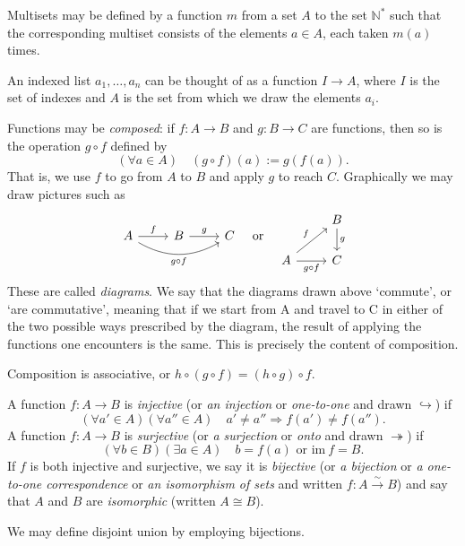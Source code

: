 Multisets may be defined by a function $m$ from a set $A$ to the set $\mathbb{N}^*$ such that the corresponding multiset consists of the elements $a\in A$, each taken $m(a)$ times.


An indexed list $a_1,\dots,a_n$ can be thought of as a function $I\rightarrow A$, where $I$ is the set of indexes and $A$ is the set from which we draw the elements $a_i$.


Functions may be \textit{composed}: if $f:A\rightarrow B$ and $g:B\rightarrow C$ are functions, then so is the operation $g\circ f$ defined by
\[
  (\forall a\in A)\quad (g\circ f)(a):=g(f(a)).
\]
That is, we use $f$ to go from $A$ to $B$ and apply $g$ to reach $C$. Graphically we may draw pictures such as
\[
  \begin{tikzcd}
    A \arrow[r, "f"] \arrow[rr, bend right=30, "g \circ f"'] & B \arrow[r, "g"] & C
  \end{tikzcd}
  \quad \text{or} \quad
  \begin{tikzcd}
    & B \arrow[d, "g"] \\
    A \arrow[ur, "f"] \arrow[r, "g \circ f"'] & C
  \end{tikzcd}
\]
These are called \textit{diagrams}. We say that the diagrams drawn above ‘commute’, or ‘are commutative’, meaning that if we start from A and travel to C in either of the two possible ways prescribed by the diagram, the result of applying the functions one encounters is the same. This is precisely the content of composition.

Composition is associative, or $h\circ(g\circ f)=(h\circ g)\circ f$.

A function $f:A\rightarrow B$ is \textit{injective} (or \textit{an injection} or \textit{one-to-one} and drawn $\hookrightarrow$) if
\[
  (\forall a'\in A)(\forall a''\in A)\quad a'\neq a''\Rightarrow f(a')\neq f(a'').
\]
A function $f:A\rightarrow B$ is \textit{surjective} (or \textit{a surjection} or \textit{onto} and drawn $\twoheadrightarrow$) if
\[
  (\forall b\in B)(\exists a\in A)\quad b=f(a)\text{ or }\mathrm{im}\ f = B.
\]
If $f$ is both injective and surjective, we say it is \textit{bijective} (or \textit{a bijection} or \textit{a one-to-one correspondence} or \textit{an isomorphism of sets} and written $f:A\xrightarrow{\sim}B$) and say that $A$ and $B$ are \textit{isomorphic} (written $A\cong B$).

We may define disjoint union by employing bijections.

